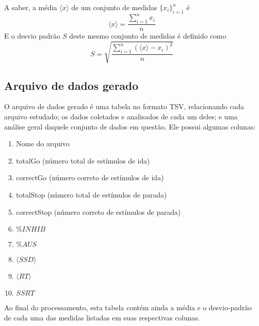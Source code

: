 \documentclass[12pt, a4paper, twoside]{article}
\begin{document}
A saber, a média $\langle x \rangle$ de um conjunto de medidas $\{x_i\}_{i=1}^{n}$ é 
$$\langle x \rangle = \frac{\sum\limits_{i=1}^{n} x_i}{n} $$
E o desvio padrão $S$ deste mesmo conjunto de medidas é definido como
$$S = \sqrt{\frac{\sum\limits_{i=1}^{n} (\langle x \rangle - x_i)^2}{n}} $$

\subsection{Arquivo de dados gerado}

O arquivo de dados gerado é uma tabela no formato TSV, relacionando cada arquivo estudado; os dados coletados e analisados de cada um deles; e uma análise geral daquele conjunto de dados em questão. Ele possui algumas colunas:

\begin{enumerate}
	\item Nome do arquivo
	\item totalGo (número total de estímulos de ida)
	\item correctGo (número correto de estímulos de ida)
	\item totalStop (número total de estímulos de parada)
	\item correctStop (número correto de estímulos de parada)
	\item $\%INHIB$
	\item $\%AUS $
	\item $\langle SSD \rangle$
	\item $\langle RT \rangle$
	\item $SSRT$
\end{enumerate}

Ao final do processamento, esta tabela contém ainda a média e o desvio-padrão de cada uma das medidas listadas em suas respectivas colunas.
\end{document}
